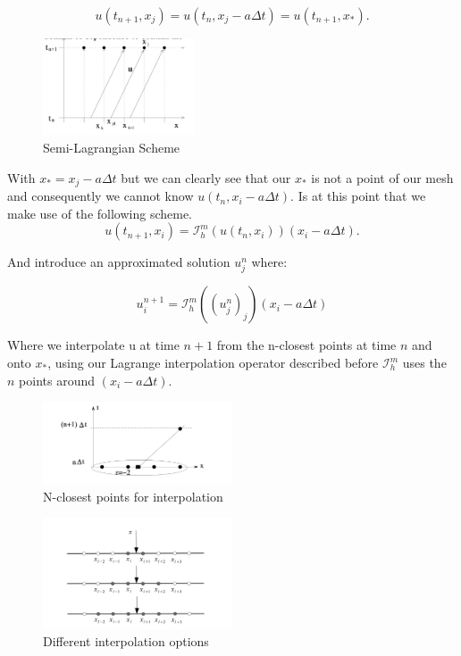 \documentclass{article}
\begin{document}
$$
u\left(t_{n+1}, x_{j}\right)=u\left(t_n, x_j-a \Delta t\right)= u (t_{n+1},x_{*}).
$$

\begin{figure}[!h]
\centering
\includegraphics[width=0.4\textwidth]{images/11.png}
\caption{Semi-Lagrangian Scheme}

\end{figure}


With  $x_{*}= x_{j}-a \Delta t$ but we can clearly see that our  $x_{*}$ is not a point of our mesh and consequently we cannot know $u\left(t_n, x_i-a \Delta t\right)$. Is at this point that we make use of the following scheme.
$$
u\left(t_{n+1}, x_i\right)=\mathcal{I}_h^m\left(u\left(t_n, x_i\right)\right)\left(x_i-a \Delta t\right).
$$

And introduce an approximated solution $u_j^n$ where:

$$
u^{n+1}_i = \mathcal{I}_{h}^m((u^n_j)_j)(x_i-a\Delta t)
$$

Where we interpolate u at time $n+1$ from the n-closest points at time $n$ and onto $x_{*}$, using our Lagrange interpolation operator described before $\mathcal{I}_h^m$ uses the $n$ points around $\left(x_i-a \Delta t\right)$.\\


\begin{figure}[!h]
\centering
\includegraphics[width=0.5\textwidth]{images/12.png}
\caption{N-closest points for interpolation}
\end{figure}


\begin{figure}[!h]
\centering
\includegraphics[width=0.5\textwidth]{images/13.png}
\caption{Different interpolation options}
\end{figure}
\end{document}
